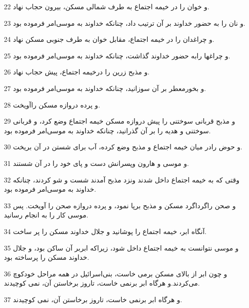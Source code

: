 \par 22 و خوان را در خیمه اجتماع به طرف شمالی مسکن، بیرون حجاب نهاد.
\par 23 و نان را به حضور خداوند بر آن ترتیب داد، چنانکه خداوند به موسی‌امر فرموده بود.
\par 24 و چراغدان را در خیمه اجتماع، مقابل خوان به طرف جنوبی مسکن نهاد.
\par 25 و چراغها رابه حضور خداوند گذاشت، چنانکه خداوند به موسی‌امر فرموده بود.
\par 26 و مذبح زرین را درخیمه اجتماع، پیش حجاب نهاد.
\par 27 و بخورمعطر بر آن سوزانید، چنانکه خداوند به موسی‌امر فرموده بود.
\par 28 و پرده دروازه مسکن راآویخت.
\par 29 و مذبح قربانی سوختنی را پیش دروازه مسکن خیمه اجتماع وضع کرد، و قربانی سوختنی و هدیه را بر آن گذرانید، چنانکه خداوند به موسی‌امر فرموده بود.
\par 30 و حوض رادر میان خیمه اجتماع و مذبح وضع کرده، آب برای شستن در آن بریخت.
\par 31 و موسی و هارون وپسرانش دست و پای خود را در آن شستند.
\par 32 وقتی که به خیمه اجتماع داخل شدند ونزد مذبح آمدند شست و شو کردند، چنانکه خداوند به موسی‌امر فرموده بود.
\par 33 و صحن راگرداگرد مسکن و مذبح برپا نمود، و پرده دروازه صحن را آویخت. پس موسی کار را به انجام رسانید.
\par 34 آنگاه ابر، خیمه اجتماع را پوشانید و جلال خداوند مسکن را پر ساخت.
\par 35 و موسی نتوانست به خیمه اجتماع داخل شود، زیراکه ابربر آن ساکن بود، و جلال خداوند مسکن را پرساخته بود.
\par 36 و چون ابر از بالای مسکن برمی خاست، بنی‌اسرائیل در همه مراحل خودکوچ می‌کردند.و هرگاه ابر برنمی خاست، تاروز برخاستن آن، نمی کوچیدند.
\par 37 و هرگاه ابر برنمی خاست، تاروز برخاستن آن، نمی کوچیدند.


